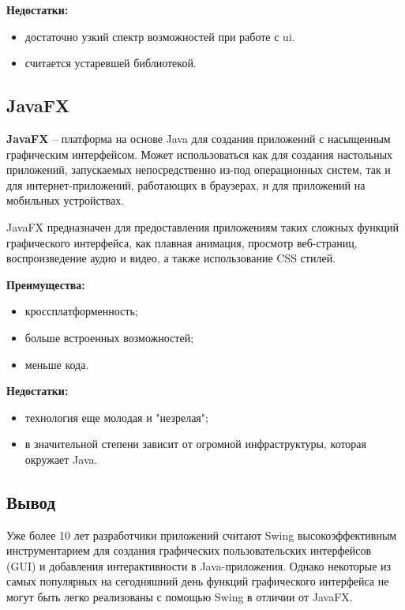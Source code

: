 \textbf{Недостатки:} 
\begin{itemize}
	\item достаточно узкий спектр возможностей при работе с ui.
	\item считается устаревшей библиотекой.
\end{itemize}


\subsection{JavaFX}

\textbf{JavaFX} -- платформа на основе Java для создания приложений с насыщенным графическим интерфейсом. Может использоваться как для создания настольных приложений, запускаемых непосредственно из-под операционных систем, так и для интернет-приложений, работающих в браузерах, и для приложений на мобильных устройствах. 

JavaFX предназначен для предоставления приложениям таких сложных функций графического интерфейса, как плавная анимация, просмотр веб-страниц, воспроизведение аудио и видео, а также использование CSS стилей.

\textbf{Преимущества:} 
\begin{itemize}
	\item кроссплатформенность;
	\item больше встроенных возможностей;
	\item меньше кода.
\end{itemize}

\textbf{Недостатки:} 
\begin{itemize}
	\item технология еще молодая и "незрелая";
	\item в значительной степени зависит от огромной инфраструктуры, которая окружает Java.
\end{itemize}



\subsection*{Вывод}

Уже более 10 лет разработчики приложений считают Swing высокоэффективным инструментарием для создания графических пользовательских интерфейсов (GUI) и добавления интерактивности в Java-приложения. Однако некоторые из самых популярных на сегодняшний день функций графического интерфейса не могут быть легко реализованы с помощью Swing в отличии от JavaFX. 

